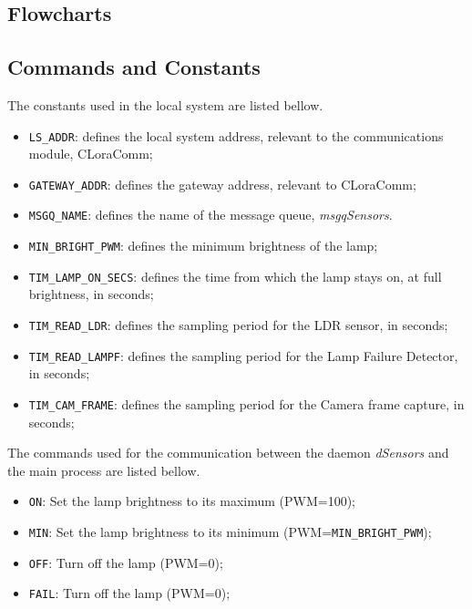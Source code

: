 \clearpage
\subsection{Flowcharts}


\clearpage
\subsection{Commands and Constants}

The constants used in the local system are listed bellow.
\begin{itemize}
	\item \verb|LS_ADDR|: defines the local system address, relevant to the communications module, CLoraComm;
	\item \verb|GATEWAY_ADDR|: defines the gateway address, relevant to CLoraComm;\\
	
	\item \verb|MSGQ_NAME|: defines the name of the message queue, \textit{msgqSensors}.
	\item \verb|MIN_BRIGHT_PWM|: defines the minimum brightness of the lamp;\\
	
	\item \verb|TIM_LAMP_ON_SECS|: defines the time from which the lamp stays on, at full brightness, in seconds;	
	\item \verb|TIM_READ_LDR|: defines the sampling period for the LDR sensor, in seconds;
	\item \verb|TIM_READ_LAMPF|: defines the sampling period for the Lamp Failure Detector, in seconds;
	\item \verb|TIM_CAM_FRAME|: defines the sampling period for the Camera frame capture, in seconds;

\end{itemize}


The commands used for the communication between the daemon \textit{dSensors} and the main process are listed bellow.

\begin{itemize}
	\item \verb|ON|: Set the lamp brightness to its maximum (PWM=100);
	\item \verb|MIN|: Set the lamp brightness to its minimum (PWM=\verb|MIN_BRIGHT_PWM|);
	\item \verb|OFF|: Turn off the lamp (PWM=0);
	\item \verb|FAIL|: Turn off the lamp (PWM=0);
\end{itemize}

